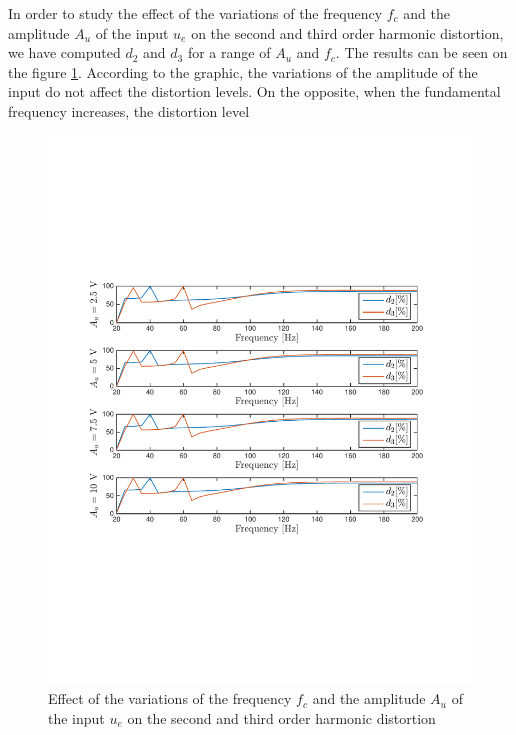In order to study the effect of the variations of the frequency $f_c$ and the amplitude $A_u$ of the input $u_e$ on the second and third order harmonic distortion, we have computed $d_2$ and $d_3$ for a range of $A_u$ and $f_c$. The results can be seen on the figure \ref{fig:d2d3}. According to the graphic, the variations of the amplitude of the input do not affect the distortion levels. On the opposite, when the fundamental frequency increases, the distortion level 

\begin{figure}[H]
 \centering 
 \includegraphics[trim=2cm 7cm 2cm 7cm, clip=true, totalheight=0.35\textheight, angle=0]{figures/d2d3.pdf}
 \caption{Effect of the variations of the frequency $f_c$ and the amplitude $A_u$ of the input $u_e$ on the second and third order harmonic distortion}
 \label{fig:d2d3}
\end{figure}